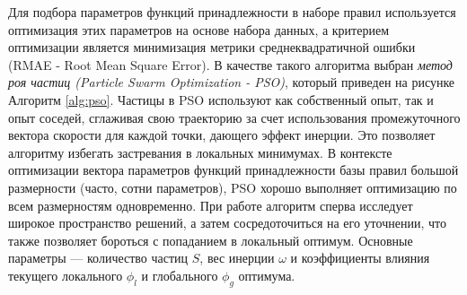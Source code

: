 Для подбора параметров функций принадлежности в наборе правил используется оптимизация этих параметров на основе набора данных, а критерием оптимизации является минимизация метрики среднеквадратичной ошибки (RMAE - Root Mean Square Error). В качестве такого алгоритма выбран \textit{метод роя частиц (Particle Swarm Optimization - PSO)}, который приведен на рисунке Алгоритм \ref{alg:pso}. Частицы в PSO используют как собственный опыт, так и опыт соседей, сглаживая свою траекторию за счет использования промежуточного вектора скорости для каждой точки, дающего эффект инерции. Это позволяет алгоритму избегать застревания в локальных минимумах. В контексте оптимизации вектора параметров функций принадлежности базы правил большой размерности (часто, сотни параметров), PSO хорошо выполняет оптимизацию по всем размерностям одновременно. При работе алгоритм сперва исследует широкое пространство решений, а затем сосредоточиться на его уточнении, что также позволяет бороться с попаданием в локальный оптимум. Основные параметры --- количество частиц $S$, вес инерции $\omega$ и коэффициенты влияния текущего локального $\phi_l$ и глобального $\phi_g$ оптимума.

